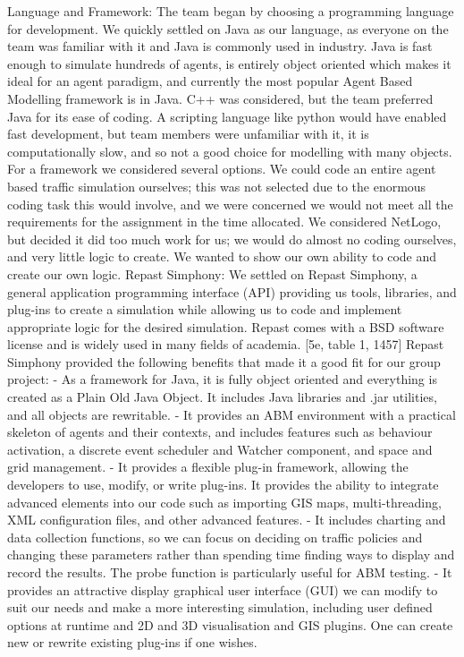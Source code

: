 \documentclass[11pt]{article}
\begin{document}
Language and Framework:
The team began by choosing a programming language for development. We quickly settled on Java as our language, as everyone on the team was familiar with it and Java is commonly used in industry. Java is fast enough to simulate hundreds of agents, is entirely object oriented which makes it ideal for an agent paradigm, and currently the most popular Agent Based Modelling framework is in Java. C++ was considered, but the team preferred Java for its ease of coding. A scripting language like python would have enabled fast development, but team members were unfamiliar with it, it is computationally slow, and so not a good choice for modelling with many objects.
For a framework we considered several options. We could code an entire agent based traffic simulation ourselves; this was not selected due to the enormous coding task this would involve, and we were concerned we would not meet all the requirements for the assignment in the time allocated. We considered NetLogo, but decided it did too much work for us; we would do almost no coding ourselves, and very little logic to create. We wanted to show our own ability to code and create our own logic.
Repast Simphony:
We settled on Repast Simphony, a general application programming interface (API) providing us tools, libraries, and plug-ins to create a simulation while allowing us to code and implement appropriate logic for the desired simulation. Repast comes with a BSD software license and is widely used in many fields of academia. [5e, table 1, 1457] Repast Simphony provided the following benefits that made it a good fit for our group project:
- As a framework for Java, it is fully object oriented and everything is created as a Plain Old Java Object. It includes Java libraries and .jar utilities, and all objects are rewritable.
- It provides an ABM environment with a practical skeleton of agents and their contexts, and includes features such as behaviour activation, a discrete event scheduler and Watcher component, and space and grid management.
- It provides a flexible plug-in framework, allowing the developers to use, modify, or write plug-ins. It provides the ability to integrate advanced elements into our code such as importing GIS maps, multi-threading, XML configuration files, and other advanced features.
- It includes charting and data collection functions, so we can focus on deciding on traffic policies and changing these parameters rather than spending time finding ways to display and record the results. The probe function is particularly useful for ABM testing.
- It provides an attractive display graphical user interface (GUI) we can modify to suit our needs and make a more interesting simulation, including user defined options at runtime and 2D and 3D visualisation and GIS plugins. One can create new or rewrite existing plug-ins if one wishes.
\end{document}
